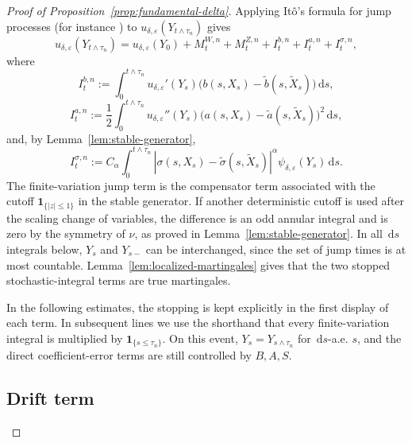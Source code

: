\documentclass[10pt,a4paper]{amsart}
\newcommand{\1}{\mathbf{1}}
\newcommand{\dd}{\,\mathrm{d}}
\newcommand{\wt}{\tilde}
\newcommand{\eps}{\varepsilon}
\begin{document}
\begin{proof}[Proof of Proposition~\ref{prop:fundamental-delta}]
Applying It\^o's formula for jump processes (for instance \cite[Theorem~4.4.7]{Applebaum2009}) to $u_{\delta,\eps}(Y_{t\wedge\tau_n})$ gives
\begin{equation}\label{eq:ito}
  u_{\delta,\eps}(Y_{t\wedge\tau_n})=u_{\delta,\eps}(Y_0)+M_{t}^{W,n}+M_{t}^{Z,n}+I_t^{b,n}+I_t^{a,n}+I_t^{\sigma,n},
\end{equation}
where
\[
I_t^{b,n}:=\int_0^{t\wedge\tau_n} u_{\delta,\eps}'(Y_s)
\bigl(b(s,X_s)-\wt b(s,\wt X_s)\bigr)\dd s,
\]
\[
I_t^{a,n}:=\frac12\int_0^{t\wedge\tau_n} u_{\delta,\eps}''(Y_s)
\bigl(a(s,X_s)-\wt a(s,\wt X_s)\bigr)^2\dd s,
\]
and, by Lemma~\ref{lem:stable-generator},
\[
I_t^{\sigma,n}:=C_\alpha\int_0^{t\wedge\tau_n} |\sigma(s,X_s)-\wt\sigma(s,\wt X_s)|^\alpha
\psi_{\delta,\eps}(Y_s)\dd s.
\]
The finite-variation jump term is the compensator term associated with the cutoff $\1_{\{|z|\le1\}}$ in the stable generator. If another deterministic cutoff is used after the scaling change of variables, the difference is an odd annular integral and is zero by the symmetry of $\nu$, as proved in Lemma~\ref{lem:stable-generator}. In all $\dd s$ integrals below, $Y_s$ and $Y_{s-}$ can be interchanged, since the set of jump times is at most countable. Lemma~\ref{lem:localized-martingales} gives that the two stopped stochastic-integral terms are true martingales.

In the following estimates, the stopping is kept explicitly in the first display of each term. In subsequent lines we use the shorthand that every finite-variation integral is multiplied by $\1_{\{s\le\tau_n\}}$. On this event, $Y_s=Y_{s\wedge\tau_n}$ for $\dd s$-a.e. $s$, and the direct coefficient-error terms are still controlled by $B,A,S$.

\subsection{Drift term}
\label{subsec:drift-term}


\end{proof}
\end{document}
